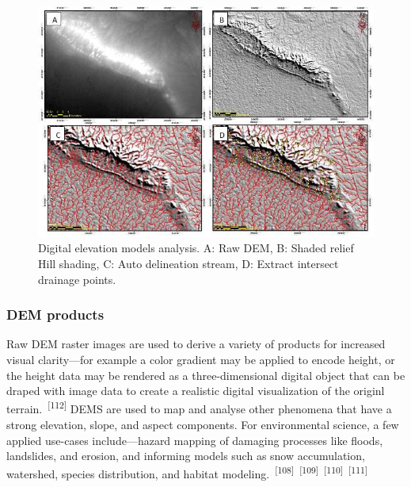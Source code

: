 \documentclass{article}
\begin{document}

\begin{figure}
    \centering
    \includegraphics[width=1.0\linewidth]{images/dem-examples.png}
    \caption{Digital elevation models analysis. A: Raw DEM, B: Shaded relief Hill shading, C: Auto delineation stream, D: Extract intersect drainage points.}
    \label{figure30}
\end{figure}

\subsubsection{DEM products}

\par{Raw DEM raster images are used to derive a variety of products for increased visual clarity---for example a color gradient may be applied to encode height, or the height data may be rendered as a three-dimensional digital object that can be draped with image data to create a realistic digital visualization of the originl terrain.~\textsuperscript{[112]} DEMS are used to map and analyse other phenomena that have a strong elevation, slope, and aspect components. For environmental science, a few applied use-cases include---hazard mapping of damaging processes like floods, landslides, and erosion, and informing models such as snow accumulation, watershed, species distribution, and habitat modeling.~\textsuperscript{[108]}~\textsuperscript{[109]}~\textsuperscript{[110]}~\textsuperscript{[111]}}

\end{document}
